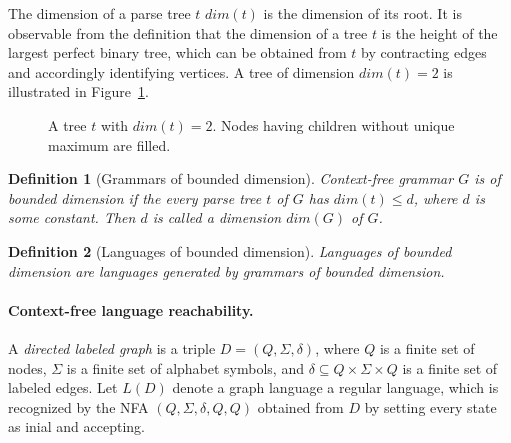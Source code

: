 \documentclass[11pt,a4paper]{article} %
\newtheorem{definition}{Definition}
\begin{document}
The dimension of a parse tree $t$ $dim(t)$ is the dimension of its root. 
It is observable from the definition that the dimension of a tree $t$
is the height of the largest perfect binary tree,
which can be obtained from $t$ by contracting edges and accordingly identifying vertices.
A tree of dimension $dim(t) = 2$ is illustrated in Figure~\ref{oscbtree}.
\begin{figure}
\centering
{}
\caption{A tree $t$ with $dim(t)=2$. Nodes having children without unique maximum are filled.}
\label{oscbtree}            
\end{figure}

\begin{definition}[Grammars of bounded dimension]
Context-free grammar $G$ is of bounded dimension if the every parse tree $t$ of $G$ has $dim(t) \le d$, where $d$ is some constant. Then $d$ is called a dimension $dim(G)$ of $G$.
\end{definition}

\begin{definition}[Languages of bounded dimension]
Languages of bounded dimension are languages generated by grammars of bounded dimension. 
\end{definition}


\paragraph{Context-free language reachability.} 
A \textit{directed labeled graph} is a triple $D = (Q, \Sigma, \delta)$, where $Q$ is a finite set of nodes, $\Sigma$ is a finite set of alphabet symbols,
and $\delta \subseteq Q \times \Sigma \times Q$ is a finite set of labeled edges. Let $L(D)$ denote a graph language a regular language, which is recognized by the NFA $(Q,\Sigma ,\delta ,Q, Q)$ obtained from $D$ by setting every state as inial and accepting.
\end{document}
